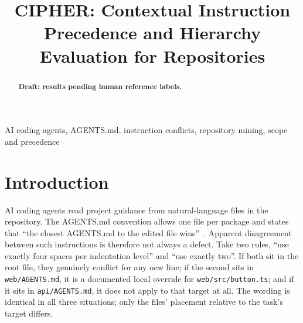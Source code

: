 \newif\ifresults



\title{CIPHER: Contextual Instruction Precedence and Hierarchy Evaluation for Repositories}

\ifanon
\author{}
\else
\author{
\and
{}
\and
{}}
\fi

\maketitle

\begin{abstract}
\ifresults\else\textbf{Draft: results pending human reference labels.}\fi
\end{abstract}

\begin{IEEEkeywords}
AI coding agents, AGENTS.md, instruction conflicts, repository mining, scope and precedence
\end{IEEEkeywords}

\section{Introduction}\label{sec:intro}
AI coding agents read project guidance from natural-language files in the repository. The AGENTS.md convention allows
one file per package and states that ``the closest AGENTS.md to the edited file wins''~\cite{agentsmd}. Apparent
disagreement between such instructions is therefore not always a defect. Take two rules, ``use exactly four spaces per
indentation level'' and ``use exactly two''. If both sit in the root file, they genuinely conflict for any new line; if
the second sits in \texttt{web/AGENTS.md}, it is a documented local override for \texttt{web/src/button.ts}; and if it
sits in \texttt{api/AGENTS.md}, it does not apply to that target at all. The wording is identical in all three
situations; only the files' placement relative to the task's target differs.

